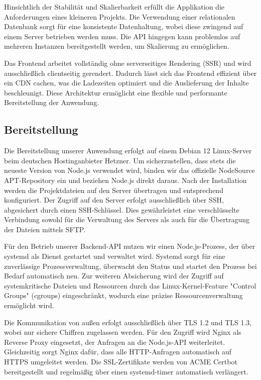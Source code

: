 \documentclass[a4paper,12pt]{article}
\begin{document}
Hinsichtlich der Stabilität und Skalierbarkeit erfüllt die Applikation die
Anforderungen eines kleineren Projekts. Die Verwendung einer relationalen
Datenbank sorgt für eine konsistente Datenhaltung, wobei diese zwingend auf
einem Server betrieben werden muss. Die API hingegen kann problemlos auf
mehreren Instanzen bereitgestellt werden, um Skalierung zu ermöglichen.

Das Frontend arbeitet vollständig ohne serverseitiges Rendering (SSR) und wird
ausschließlich clientseitig gerendert. Dadurch lässt sich das Frontend
effizient über ein CDN cachen, was die Ladezeiten optimiert und die
Auslieferung der Inhalte beschleunigt. Diese Architektur ermöglicht eine
flexible und performante Bereitstellung der Anwendung.

\subsection{Bereitstellung}

Die Bereitstellung unserer Anwendung erfolgt auf einem Debian 12 Linux-Server
beim deutschen Hostinganbieter Hetzner. Um sicherzustellen, dass stets die
neueste Version von Node.js verwendet wird, binden wir das offizielle
NodeSource APT-Repository ein und beziehen Node.js direkt daraus. Nach der
Installation werden die Projektdateien auf den Server übertragen und
entsprechend konfiguriert. Der Zugriff auf den Server erfolgt ausschließlich
über SSH, abgesichert durch einen SSH-Schlüssel. Dies gewährleistet eine
verschlüsselte Verbindung sowohl für die Verwaltung des Servers als auch für
die Übertragung der Dateien mittels SFTP.

Für den Betrieb unserer Backend-API nutzen wir einen Node.js-Prozess, der über
systemd als Dienst gestartet und verwaltet wird. Systemd sorgt für eine
zuverlässige Prozessverwaltung, überwacht den Status und startet den Prozess
bei Bedarf automatisch neu. Zur weiteren Absicherung wird der Zugriff auf
systemkritische Dateien und Ressourcen durch das Linux-Kernel-Feature "Control
Groups" (cgroups) eingeschränkt, wodurch eine präzise Ressourcenverwaltung
ermöglicht wird.

Die Kommunikation von außen erfolgt ausschließlich über TLS 1.2 und TLS 1.3,
wobei nur sichere Chiffren zugelassen werden. Für den Zugriff wird Nginx als
Reverse Proxy eingesetzt, der Anfragen an die Node.js-API weiterleitet.
Gleichzeitig sorgt Nginx dafür, dass alle HTTP-Anfragen automatisch auf HTTPS
umgeleitet werden. Die SSL-Zertifikate werden von ACME Certbot bereitgestellt
und regelmäßig über einen systemd-timer automatisch verlängert.
\end{document}
